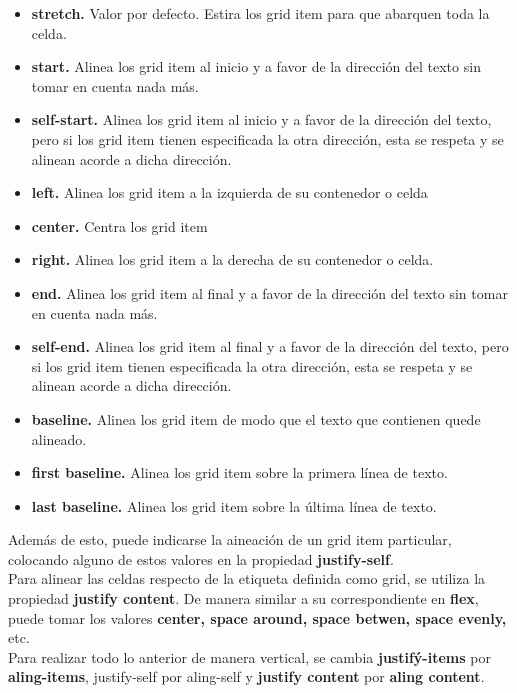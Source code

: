 \documentclass[10pt,oneside]{article}
\begin{document}
\begin{multicols}{2}
    \begin{itemize}
        \item \textbf{stretch.} Valor por defecto. Estira los grid item para que abarquen toda la celda.
        \item \textbf{start.} Alinea los grid item al inicio y a favor de la dirección del texto sin tomar en cuenta nada más.
        \item \textbf{self-start.} Alinea los grid item al inicio y a favor de la dirección del texto, pero si los grid item tienen especificada la otra dirección, esta se respeta y se alinean acorde a dicha dirección. 
        \item \textbf{left.} Alinea los grid item a la izquierda de su contenedor o celda
        \item \textbf{center.} Centra los grid item
        \item \textbf{right.} Alinea los grid item a la derecha de su contenedor o celda.
        \item \textbf{end.} Alinea los grid item al final y a favor de la dirección del texto sin tomar en cuenta nada más.
        \item \textbf{self-end.} Alinea los grid item al final y a favor de la dirección del texto, pero si los grid item tienen especificada la otra dirección, esta se respeta y se alinean acorde a dicha dirección.
        \item \textbf{baseline.} Alinea los grid item de modo que el texto que contienen quede alineado.
        \item \textbf{first baseline.} Alinea los grid item sobre la primera línea de texto.
        \item \textbf{last baseline.} Alinea los grid item sobre la última línea de texto.
    \end{itemize}

    Además de esto, puede indicarse la aineación de un grid item particular, colocando alguno de estos valores en la propiedad \textbf{justify-self}.\\ \newline Para alinear las celdas respecto de la etiqueta definida como grid, se utiliza la propiedad \textbf{justify content}. De manera similar a su correspondiente en  \textbf{flex}, puede tomar los valores \textbf{center, space around, space betwen, space evenly,} etc. \\ \newline Para realizar todo lo anterior de manera vertical, se cambia \textbf{justifý-items} por \textbf{aling-items}, {justify-self} por {aling-self} y \textbf{justify content} por \textbf{aling content}.


\end{multicols}
\end{document}
